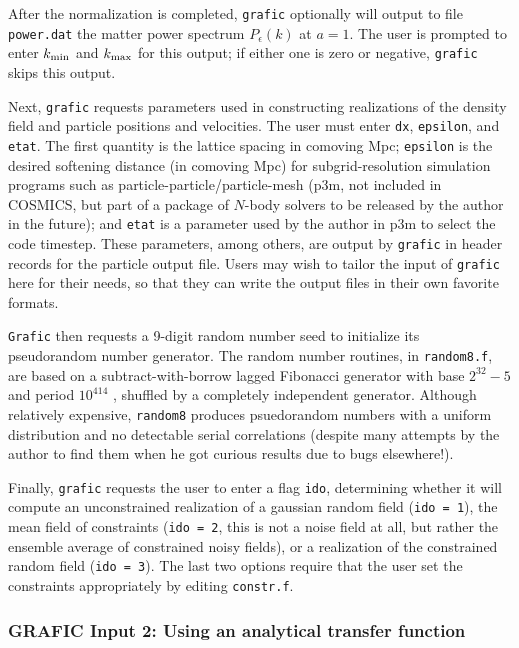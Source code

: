 After the normalization is completed, {\tt grafic} optionally will output
to file {\tt power.dat} the matter power spectrum $P_\epsilon(k)$ at
$a=1$.  The user is prompted to enter $k_{\rm min}$ and $k_{\rm max}$
for this output; if either one is zero or negative, {\tt grafic} skips
this output.

Next, {\tt grafic} requests parameters used in constructing realizations
of the density field and particle positions and velocities.  The user
must enter {\tt dx}, {\tt epsilon}, and {\tt etat}.  The first quantity
is the lattice spacing in comoving Mpc; {\tt epsilon} is the desired softening
distance (in comoving Mpc) for subgrid-resolution simulation programs
such as particle-particle/particle-mesh (p3m, not included in COSMICS,
but part of a package of $N$-body solvers to be released by the author
in the future); and {\tt etat} is a parameter used by the author in p3m
to select the code timestep.  These parameters, among others, are output
by {\tt grafic} in header records for the particle output file.  Users may
wish to tailor the input of {\tt grafic} here for their needs, so that they
can write the output files in their own favorite formats.

{\tt Grafic} then requests a 9-digit random number seed to initialize
its pseudorandom number generator.  The random number routines, in
{\tt random8.f}, are based on a subtract-with-borrow lagged Fibonacci
generator with base $2^{32}-5$ and period $10^{414}$ \cite{mz}, shuffled by a
completely independent generator.  Although relatively expensive,
{\tt random8} produces psuedorandom numbers with a uniform distribution
and no detectable serial correlations (despite many attempts by the author
to find them when he got curious results due to bugs elsewhere!).

Finally, {\tt grafic} requests the user to enter a flag {\tt ido},
determining whether it will compute an unconstrained realization of
a gaussian random field ({\tt ido = 1}), the mean field of constraints
({\tt ido = 2}, this is not a noise field at all, but rather the ensemble
average of constrained noisy fields), or a realization of the constrained
random field ({\tt ido = 3}).  The last two options require that the
user set the constraints appropriately by editing {\tt constr.f}.

\subsubsection{GRAFIC Input 2: Using an analytical transfer function}
\label{grafic2}

